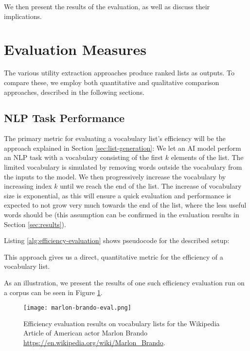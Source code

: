 We then present the results of the evaluation, as well as discuss their implications.

\section{Evaluation Measures}

The various utility extraction approaches produce ranked lists as outputs.
To compare these, we employ both quantitative and qualitative comparison approaches, described in the following sections.

\subsection{NLP Task Performance}
The primary metric for evaluating a vocabulary list's efficiency will be the approach explained in Section \ref{sec:list-generation}:
We let an AI model perform an NLP task with a vocabulary consisting of the first $k$ elements of the list.
The limited vocabulary is simulated by removing words outside the vocabulary from the inputs to the model.
We then progressively increase the vocabulary by increasing index $k$ until we reach the end of the list.
The increase of vocabulary size is exponential, as this will ensure a quick evaluation and performance is expected to not grow very much towards the end of the list, where the less useful words should be (this assumption can be confirmed in the evaluation results in Section \ref{sec:results}).

Listing \ref{alg:efficiency-evaluation} shows pseudocode for the described setup:




This approach gives us a direct, quantitative metric for the efficiency of a vocabulary list.

As an illustration, we present the results of one such efficiency evaluation run on a corpus can be seen in Figure \ref{fig:marlon-brando-eval}.
\begin{figure}[H]
	\centering
	\texttt{[image: marlon-brando-eval.png]}
	\caption{Efficiency evaluation results on vocabulary lists for the Wikipedia Article of American actor Marlon Brando \url{https://en.wikipedia.org/wiki/Marlon_Brando}.}
	\label{fig:marlon-brando-eval}
\end{figure}

